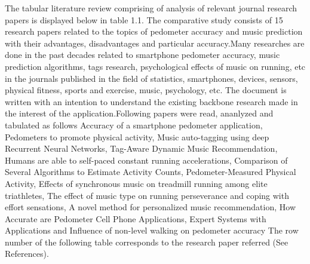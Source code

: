 \documentclass[10pt, a4paper]{article}
\begin{document}
The tabular literature review comprising of analysis of relevant journal research papers is displayed below in table 1.1. The comparative study consists of 15 research papers related to the topics of pedometer accuracy and music prediction with their advantages, disadvantages  and particular accuracy.Many researches are done in the past decades related to smartphone pedometer accuracy, music prediction algorithms, tags research, psychological effects of music on running, etc in the journals published in the field of statistics, smartphones, devices, sensors, physical fitness, sports and exercise, music, psychology, etc. The document is written with an intention to understand the existing backbone research made in the interest of the application.Following papers were read, ananlyzed and tabulated as follows
\cite{1}Accuracy of a smartphone pedometer application,   
\cite{2}Pedometers to promote physical activity,  
\cite{4}Music auto-tagging using deep Recurrent Neural Networks, 
\cite{5}Tag-Aware Dynamic Music Recommendation, 
\cite{6}Humans are able to self-paced constant running accelerations, 
\cite{7}Comparison of Several Algorithms to Estimate Activity Counts, 
\cite{8}Pedometer-Measured Physical Activity, 
\cite{9}Effects of synchronous music on treadmill running among elite triathletes, 
\cite{10}The effect of music type on running perseverance and coping with effort sensations, 
\cite{11}A novel method for personalized music recommendation,  
\cite{12}How Accurate are Pedometer Cell Phone Applications, 
\cite{13}Expert Systems with Applications and 
\cite{14}Influence of non-level walking on pedometer accuracy
The row number of the following table corresponds to the research paper referred (See References).
\end{document}

